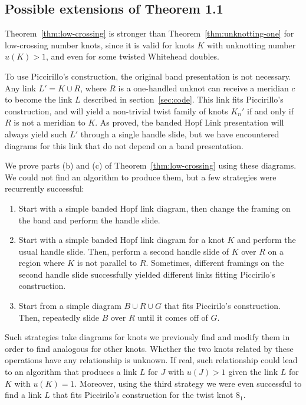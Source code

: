 \documentclass[11pt,usenames,dvipsnames,reqno]{amsart}
\numberwithin{theorem}{section}
\theoremstyle{ex}
\theoremstyle{rem}
\begin{document}
\subsection{Possible extensions of Theorem 1.1}

Theorem~\ref{thm:low-crossing} is stronger than Theorem~\ref{thm:unknotting-one} for low-crossing number knots, since it is valid for knots $K$ with unknotting number $u(K) > 1$, and even for some twisted Whitehead doubles. 

To use Piccirillo's construction, the original band presentation is not necessary. Any link $L' = K\cup R$, where $R$ is a one-handled unknot can receive a meridian $c$ to become the link $L$ described in section~\ref{sec:code}. This link fits Piccirillo's construction, and will yield a non-trivial twist family of knots $K_{n}'$ if and only if $R$ is not a meridian to $K$. As proved, the banded Hopf Link presentation will always yield such $L'$ through a single handle slide, but we have encountered diagrams for this link that do not depend on a band presentation.

We prove parts (b) and (c) of Theorem~\ref{thm:low-crossing} using these diagrams. We could not find an algorithm to produce them, but a few strategies were recurrently successful:

\begin{enumerate}
	\item Start with a simple banded Hopf link diagram, then change the framing on the band and perform the handle slide.
	\item Start with a simple banded Hopf link diagram for a knot $K$ and perform the usual handle slide. Then, perform a second handle slide of $K$ over $R$ on a region where $K$ is not parallel to $R$. Sometimes, different framings on the second handle slide successfully yielded different links fitting Piccirilo's construction.
	\item Start from a simple diagram $B \cup R \cup G$ that fits Piccirilo's construction. Then, repeatedly slide $B$ over $R$ until it comes off of $G$.
\end{enumerate}

Such strategies take diagrams for knots we previously find and modify them in order to find analogous for other knots. Whether the two knots related by these operations have any relationship is unknown. If real, such relationship could lead to an algorithm that produces a link $L$ for $J$ with $u(J) > 1$ given the link $L$ for $K$ with $u(K) = 1$. Moreover, using the third strategy we were even successful to find a link $L$ that fits Piccirilo's construction for the twist knot $8_1$.
\end{document}
